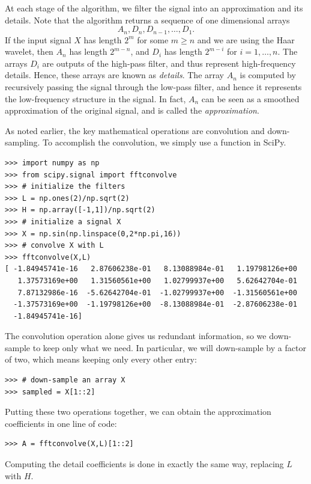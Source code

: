 At each stage of the algorithm, we filter the signal into an approximation and its details.
Note that the algorithm returns a sequence of one dimensional arrays
\[A_n, D_n, D_{n-1}, \ldots, D_1.\]
If the input signal $X$ has length $2^m$ for
some $m \geq n$ and we are using the Haar wavelet, then $A_n$ has length $2^{m-n}$, and $D_i$ has length $2^{m-i}$
for $i=1,\ldots,n$. The arrays $D_i$ are outputs of the high-pass filter, and thus represent high-frequency
details.
Hence, these arrays are known as \emph{details}.
The array $A_n$ is computed by recursively passing the signal through the low-pass filter, and hence it
represents the low-frequency structure in the signal.
In fact, $A_n$ can be seen as a smoothed approximation of the original signal, and is called the \emph{approximation}.

As noted earlier, the key mathematical operations are convolution and down-sampling.
To accomplish the convolution, we simply use a function in SciPy.
\begin{lstlisting}
>>> import numpy as np
>>> from scipy.signal import fftconvolve
>>> # initialize the filters
>>> L = np.ones(2)/np.sqrt(2)
>>> H = np.array([-1,1])/np.sqrt(2)
>>> # initialize a signal X
>>> X = np.sin(np.linspace(0,2*np.pi,16))
>>> # convolve X with L
>>> fftconvolve(X,L)
[ -1.84945741e-16   2.87606238e-01   8.13088984e-01   1.19798126e+00
   1.37573169e+00   1.31560561e+00   1.02799937e+00   5.62642704e-01
   7.87132986e-16  -5.62642704e-01  -1.02799937e+00  -1.31560561e+00
  -1.37573169e+00  -1.19798126e+00  -8.13088984e-01  -2.87606238e-01
  -1.84945741e-16]
\end{lstlisting}
The convolution operation alone gives us redundant information, so we down-sample to keep only what we need.
In particular, we will down-sample by a factor
of two, which means keeping only every other entry:
\begin{lstlisting}
>>> # down-sample an array X
>>> sampled = X[1::2]
\end{lstlisting}
Putting these two operations together, we can obtain the approximation coefficients in one
line of code:
\begin{lstlisting}
>>> A = fftconvolve(X,L)[1::2]
\end{lstlisting}
Computing the detail coefficients is done in exactly the same way, replacing $L$ with $H$.
